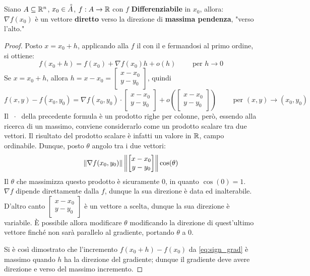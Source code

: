 \begin{proposition} %
	Siano $A \subseteq \mathbb{R}^n$, $x_0 \in \accentset{\circ}{A}$, $f: A \to \mathbb{R}$ con $f$ \textbf{Differenziabile} in $x_0$, allora:\\
	$\nabla f(x_0)$ è un vettore \textbf{diretto} verso la direzione di \textbf{massima pendenza}, "verso l'alto."
	\begin{proof}
		Posto $x = x_0 + h$, applicando alla $f$ il  con il  e fermandosi al primo ordine, si ottiene:
		\begin{equation}
			\label{eq:sign_grad}
			f(x_0 + h) = f(x_0) + \nabla f(x_0) h + o(h) \qquad \text{ per } h \to 0
		\end{equation}
		Se $x = x_0 + h$, allora $h = x - x_0 = \begin{bmatrix}x - x_0\\y - y_0\end{bmatrix}$, quindi
		\[f(x, y) - f(x_0, y_0) = \nabla f(x_0, y_0) \cdot \begin{bmatrix}x - x_0\\y - y_0\end{bmatrix} + o \left(\begin{bmatrix}x - x_0\\y - y_0\end{bmatrix} \right) \qquad \text{ per } (x, y) \to (x_0, y_0)\]
		Il $\;\cdot\;$ della precedente formula è un prodotto righe per colonne, però, essendo alla ricerca di un massimo, conviene considerarlo come un prodotto scalare tra due vettori. Il risultato del prodotto scalare è infatti un valore in $\mathbb{R}$, campo ordinabile. Dunque, posto $\theta$ angolo tra i due vettori:
		\[\left\|\nabla f(x_0, y_0)\right\| \left\|\begin{bmatrix}x - x_0\\y - y_0\end{bmatrix}\right\| \cos(\theta)\]
		Il $\theta$ che massimizza questo prodotto è sicuramente $0$, in quanto $\cos(0) = 1$.\\
		$\nabla f$ dipende direttamente dalla $f$, dunque la sua direzione è data ed inalterabile. D'altro canto $\begin{bmatrix}x - x_0\\y - y_0\end{bmatrix}$ è un vettore a scelta, dunque la sua direzione è variabile. È possibile allora modificare $\theta$ modificando la direzione di quest'ultimo vettore finché non sarà parallelo al gradiente, portando $\theta$ a $0$.

		Si è così dimostrato che l'incremento $f(x_0 + h) - f(x_0)$ da \cref{eq:sign_grad} è massimo quando $h$ ha la direzione del gradiente; dunque il gradiente deve avere direzione e verso del massimo incremento.
	\end{proof}
\end{proposition}

